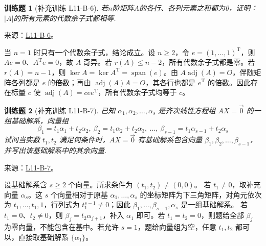 \documentclass[12pt,fontset=fandol]{ctexart}
\newtheorem{exercise}{训练题}[section]
\begin{document}
\begin{exercise}[补充训练 L11-B-6]\label{prob:L11-B-6}
若$n$阶矩阵$A$的各行、各列元素之和都为0，证明：$|A|$的所有元素的代数余子式都相等.
\end{exercise}
\noindent 来源：\href{https://github.com/yhwu-is/Linear-Algebra-Left-Undone/blob/new/%E8%AE%B2%E4%B9%89/%E4%B8%93%E9%A2%98/11%20%E6%9C%9D%E8%8A%B1%E5%A4%95%E6%8B%BE.tex}{L11-B-6}。
\begin{solve}
当 $n=1$ 时只有一个代数余子式，结论成立。设 $n\ge2$，令 $e=(1,\ldots,1)^{\mathrm T}$，则 $Ae=0$、$A^{\mathrm T}e=0$，故 $A$ 奇异。若 $r(A)\le n-2$，所有代数余子式都是零。若 $r(A)=n-1$，则 $\ker A=\ker A^{\mathrm T}=\operatorname{span}(e)$。由 $A\operatorname{adj}(A)=O$，伴随矩阵各列都是 $e$ 的倍数；再由 $\operatorname{adj}(A)A=O$，其各行也都是 $e^{\mathrm T}$ 的倍数。因此存在标量 $c$ 使 $\operatorname{adj}(A)=cee^{\mathrm T}$，所有代数余子式均等于 $c$。
\end{solve}

\begin{exercise}[补充训练 L11-B-7]\label{prob:L11-B-7}
已知 $\alpha_1,\alpha_2,\ldots,\alpha_s$ 是齐次线性方程组 $AX=\vec{0}$ 的一组基础解系，向量组
        \[\beta_1=t_1\alpha_1+t_2\alpha_2,\ \beta_2=t_1\alpha_2+t_2\alpha_3,\ \ldots,\ \beta_{s-1}=t_1\alpha_{s-1}+t_2\alpha_s\]
        试问当实数 $t_1,t_2$ 满足何条件时，$AX=\vec{0}$ 有基础解系包含向量 $\beta_1,\beta_2,\ldots,\beta_{s-1}$，并写出该基础解系中的其余向量.
\end{exercise}
\noindent 来源：\href{https://github.com/yhwu-is/Linear-Algebra-Left-Undone/blob/new/%E8%AE%B2%E4%B9%89/%E4%B8%93%E9%A2%98/11%20%E6%9C%9D%E8%8A%B1%E5%A4%95%E6%8B%BE.tex}{L11-B-7}。
\begin{solve}
设基础解系含 $s\ge2$ 个向量。所求条件为 $(t_1,t_2)\ne(0,0)$。
若 $t_1\ne0$，取补充向量 $\alpha_s$。这 $s$ 个向量相对于原基 $\alpha_1,\ldots,\alpha_s$ 的坐标矩阵为下三角矩阵，对角元依次为 $t_1,\ldots,t_1,1$，行列式为 $t_1^{s-1}\ne0$；因此 $\beta_1,\ldots,\beta_{s-1},\alpha_s$ 是一组基础解系。
若 $t_1=0$、$t_2\ne0$，则 $\beta_j=t_2\alpha_{j+1}$，补入 $\alpha_1$ 即可。若 $t_1=t_2=0$，则题给全部 $\beta_j$ 为零向量，不能包含在基中。若允许 $s=1$，题给向量组为空，任意 $t_1,t_2$ 都可以，直接取基础解系 $\{\alpha_1\}$。
\end{solve}
\end{document}
